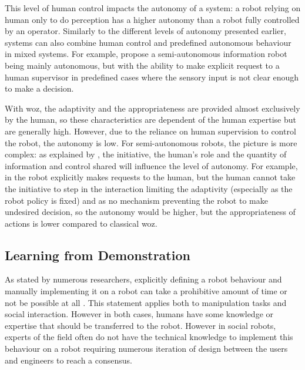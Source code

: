 	This level of human control impacts the autonomy of a system: a robot relying on human only to do perception has a higher autonomy than a robot fully controlled by an operator. Similarly to the different levels of autonomy presented earlier, systems can also combine human control and predefined autonomous behaviour in mixed systems. For example, \citet{shiomi2008semi} propose a semi-autonomous information robot being mainly autonomous, but with the ability to make explicit request to a human supervisor in predefined cases where the sensory input is not clear enough to make a decision. %
	
	With \gls{woz}, the adaptivity and the appropriateness are provided almost exclusively by the human, so these characteristics are dependent of the human expertise but are generally high. However, due to the reliance on human supervision to control the robot, the autonomy is low. For semi-autonomous robots, the picture is more complex: as explained by \cite{beer2014toward}, the initiative, the human's role and the quantity of information and control shared will influence the level of autonomy. For example, in \citet{shiomi2008semi} the robot explicitly makes requests to the human, but the human cannot take the initiative to step in the interaction limiting the adaptivity (especially as the robot policy is fixed) and as no mechanism preventing the robot to make undesired decision, so the autonomy would be higher, but the appropriateness of actions is lower compared to classical \gls{woz}.

\subsection{Learning from Demonstration} \label{ssec:back_lfd}
	As stated by numerous researchers, explicitly defining a robot behaviour and manually implementing it on a robot can take a prohibitive amount of time or not be possible at all \citep{argall2009survey,billard2008robot}. This statement applies both to manipulation tasks and social interaction. However in both cases, humans have some knowledge or expertise that should be transferred to the robot. However in social robots, experts of the field often do not have the technical knowledge to implement this behaviour on a robot requiring numerous iteration of design between the users and engineers to reach a consensus. 
	
